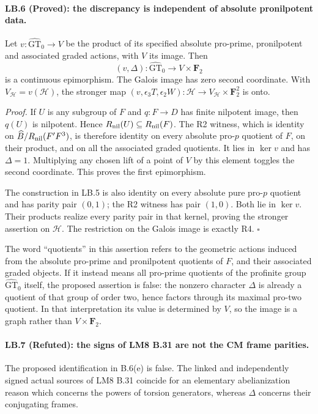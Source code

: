 \paragraph{LB.6 (Proved): the discrepancy is independent of absolute pronilpotent data.}
Let $v:\widehat{\mathrm{GT}}_0\to V$ be the product of its
specified absolute pro-prime, pronilpotent and associated graded
actions, with $V$ its image. Then
\[
 (v,\Delta):\widehat{\mathrm{GT}}_0
                  \longrightarrow V\times\mathbf F_2
\]
is a continuous epimorphism. The Galois image has zero second
coordinate. With $V_{\mathcal H}=v(\mathcal H)$, the stronger
map $(v,\epsilon_3T,\epsilon_2W):\mathcal H\to
V_{\mathcal H}\times\mathbf F_2^2$ is onto.

\emph{Proof.}
If $U$ is any subgroup of $F$ and $q:F\to D$ has finite
nilpotent image, then $q(U)$ is nilpotent. Hence
$R_{\rm nil}(U)\subseteq R_{\rm nil}(F)$. The R2 witness,
which is identity on $\widehat B/R_{\rm nil}(F'F^3)$, is
therefore identity on every absolute pro-$p$ quotient of $F$,
on their product, and on all the associated graded quotients.
It lies in $\ker v$ and has $\Delta=1$. Multiplying any chosen
lift of a point of $V$ by this element toggles the second
coordinate. This proves the first epimorphism.

The construction in LB.5 is also identity on every absolute
pure pro-$p$ quotient and has parity pair $(0,1)$; the R2
witness has pair $(1,0)$. Both lie in $\ker v$. Their products
realize every parity pair in that kernel, proving the stronger
assertion on $\mathcal H$. The restriction on the Galois image
is exactly R4. \hfill$\square$

The word ``quotients'' in this assertion refers to the geometric
actions induced from the absolute pro-prime and pronilpotent
quotients of $F$, and their associated graded objects. If it
instead means all pro-prime quotients of the profinite group
$\widehat{\mathrm{GT}}_0$ itself, the proposed assertion is false:
the nonzero character $\Delta$ is already a quotient of that group
of order two, hence factors through its maximal pro-two quotient.
In that interpretation its value is determined by $V$, so the
image is a graph rather than $V\times\mathbf F_2$.

\paragraph{LB.7 (Refuted): the signs of LM8 B.31 are not the CM frame parities.}
The proposed identification in B.6(e) is false. The linked and
independently signed actual sources of LM8 B.31 coincide for
an elementary abelianization reason which concerns the powers
of torsion generators, whereas $\Delta$ concerns their
conjugating frames.

